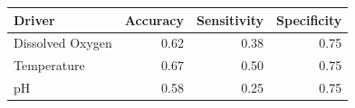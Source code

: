 
\begin{tabular}{lrrr}
\toprule
Driver & Accuracy & Sensitivity & Specificity\\
\midrule
Dissolved Oxygen & 0.62 & 0.38 & 0.75\\
Temperature & 0.67 & 0.50 & 0.75\\
pH & 0.58 & 0.25 & 0.75\\
\bottomrule
\end{tabular}